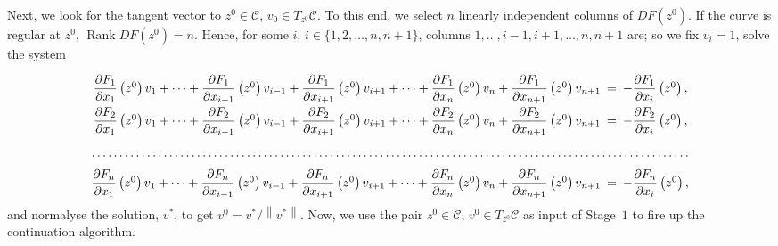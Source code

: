 \documentclass[11pt,reqno,twoside]{article}
\newcommand{\rank}{\mathop{\mathrm{Rank}}}
\theoremstyle{remark}
\begin{document}
Next, we look for the tangent vector to $z^{0}\in\mathcal{C}$, $v_{0}\in
T_{z^{0}}\mathcal{C}$. To this end, we select $n$ linearly independent
columns of $DF\left(z^{0}\right)$. If the curve is regular at $z^{0}$,
$\rank DF\left(z^{0}\right) = n$. Hence, for some $i$,
$i\in\{1,2,\dots,n,n+1\}$, columns $1,\dots,i-1,i+1,\dots,n,n+1$ are; so we
fix $v_{i} = 1$, solve the system
\begin{displaymath}
  \renewcommand{\arraystretch}{2}
  \begin{array}{rcl}
  \dfrac{\partial F_{1}}{\partial x_{1}}\left(z^{0}\right)v_{1} +
  \dots + 
  \dfrac{\partial F_{1}}{\partial x_{i-1}}\left(z^{0}\right)v_{i-1} +
  \dfrac{\partial F_{1}}{\partial x_{i+1}}\left(z^{0}\right)v_{i+1} +
  \dots +
   \dfrac{\partial F_{1}}{\partial x_{n}}\left(z^{0}\right)v_{n} +
   \dfrac{\partial F_{1}}{\partial x_{n+1}}\left(z^{0}\right)v_{n+1}
   &\!\!\! = \!\!\! &
   -\dfrac{\partial F_{1}}{\partial x_{i}}\left(z^{0}\right),\\
  \dfrac{\partial F_{2}}{\partial x_{1}}\left(z^{0}\right)v_{1} +
  \dots + 
  \dfrac{\partial F_{2}}{\partial x_{i-1}}\left(z^{0}\right)v_{i-1} +
  \dfrac{\partial F_{2}}{\partial x_{i+1}}\left(z^{0}\right)v_{i+1} +
  \dots +  
   \dfrac{\partial F_{2}}{\partial x_{n}}\left(z^{0}\right)v_{n} +
   \dfrac{\partial F_{2}}{\partial x_{n+1}}\left(z^{0}\right)v_{n+1}
   &\!\!\!= \!\!\! & 
  -\dfrac{\partial F_{2}}{\partial x_{i}}\left(z^{0}\right),\\
  \hdotsfor{3}\\
  \dfrac{\partial F_{n}}{\partial x_{1}}\left(z^{0}\right)v_{1} +
  \dots + 
  \dfrac{\partial F_{n}}{\partial x_{i-1}}\left(z^{0}\right)v_{i-1} +
  \dfrac{\partial F_{n}}{\partial x_{i+1}}\left(z^{0}\right)v_{i+1} +
  \dots +  
   \dfrac{\partial F_{n}}{\partial x_{n}}\left(z^{0}\right)v_{n} +
   \dfrac{\partial F_{n}}{\partial x_{n+1}}\left(z^{0}\right)v_{n+1}
   &\!\!\!= \!\!\! & 
  -\dfrac{\partial F_{n}}{\partial x_{i}}\left(z^{0}\right),
\end{array}  
\end{displaymath}
and normalyse the solution, $v^{\ast}$, to get $v^{0} = v^{\ast}/\left\|
v^{\ast}\right\|$. Now, we use the pair $z^{0}\in\mathcal{C}$, $v^{0}\in
T_{z^{0}}\mathcal{C}$ as input of Stage~$1$ to fire up the continuation
algorithm.



\end{document}
